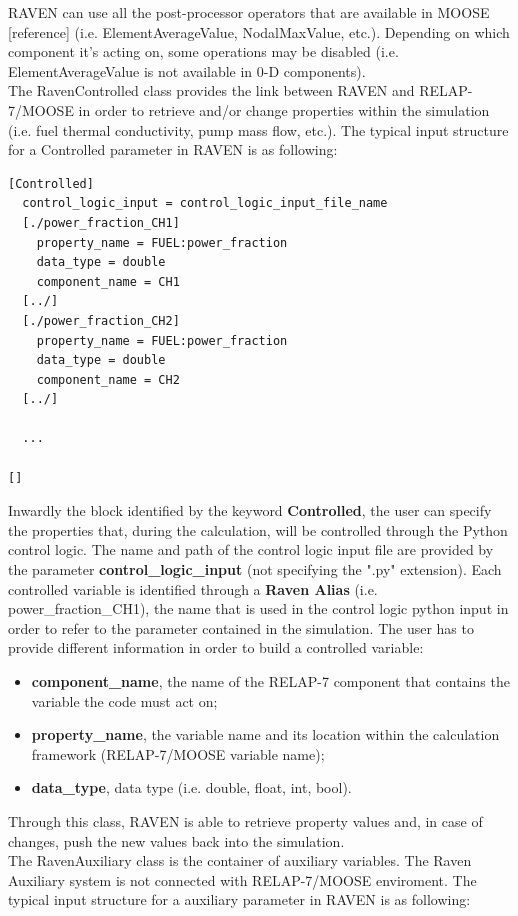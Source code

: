\documentclass{mc2013}
\begin{document}
RAVEN can use all the post-processor operators that are available in MOOSE [reference] (i.e. ElementAverageValue, NodalMaxValue, etc.). Depending on which component it's acting on, some operations may be disabled (i.e. ElementAverageValue is not available in 0-D components).
\\The RavenControlled class provides the link between RAVEN and RELAP-7/MOOSE in order to retrieve and/or change properties within the simulation (i.e. fuel thermal conductivity, pump mass flow, etc.). The typical input structure for a Controlled parameter in RAVEN is as following:
\begin{lstlisting}
[Controlled]
  control_logic_input = control_logic_input_file_name
  [./power_fraction_CH1]
    property_name = FUEL:power_fraction
    data_type = double
    component_name = CH1
  [../]
  [./power_fraction_CH2]
    property_name = FUEL:power_fraction
    data_type = double
    component_name = CH2
  [../]

  ...

[]
\end{lstlisting}
Inwardly the block identified by the keyword \textbf{Controlled}, the user can specify the properties that, during the calculation, will be controlled through the Python control logic. The name and path of the control logic input file are provided by the parameter  \textbf{control\_logic\_input} (not specifying the ".py" extension). Each controlled variable is identified through a \textbf{Raven Alias} (i.e. power\_fraction\_CH1), the name that is used in the control logic python input in order to refer to the parameter contained in the simulation.
The user has to provide different information in order to build a controlled variable:
\begin{itemize}
  \item \textbf{component\_name}, the name of the RELAP-7 component that contains the variable the code must act on;
  \item \textbf{property\_name}, the variable name and its location within the calculation framework (RELAP-7/MOOSE variable name);
  \item \textbf{data\_type}, data type (i.e. double, float, int, bool).
\end{itemize}
Through this class, RAVEN is able to retrieve property values and, in case of changes, push the new values back into the simulation. 
\\The RavenAuxiliary class is the container of auxiliary variables. The Raven Auxiliary system is not connected with RELAP-7/MOOSE enviroment. The typical input structure for a auxiliary parameter in RAVEN is as following:
\end{document}

